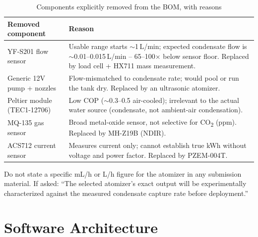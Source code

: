 \documentclass[11pt,a4paper]{article}
\begin{document}
\begin{table}[h!]
\centering
\caption{Components explicitly removed from the BOM, with reasons}
\begin{tabular}{p{3.3cm}p{10cm}}
\toprule
\textbf{Removed component} & \textbf{Reason} \\
\midrule
YF-S201 flow sensor & Usable range starts $\sim$1\,L/min; expected condensate flow is $\sim$0.01--0.015\,L/min -- 65--100$\times$ below sensor floor. Replaced by load cell + HX711 mass measurement. \\
Generic 12V pump + nozzles & Flow-mismatched to condensate rate; would pool or run the tank dry. Replaced by an ultrasonic atomizer. \\
Peltier module (TEC1-12706) & Low COP ($\sim$0.3--0.5 air-cooled); irrelevant to the actual water source (condensate, not ambient-air condensation). \\
MQ-135 gas sensor & Broad metal-oxide sensor, not selective for CO\textsubscript{2} (ppm). Replaced by MH-Z19B (NDIR). \\
ACS712 current sensor & Measures current only; cannot establish true kWh without voltage and power factor. Replaced by PZEM-004T. \\
\bottomrule
\end{tabular}
\end{table}

\begin{limitation}
Do not state a specific mL/h or L/h figure for the atomizer in any submission material. If asked: ``The selected atomizer's exact output will be experimentally characterized against the measured condensate capture rate before deployment.''
\end{limitation}

\section{Software Architecture}
\end{document}
